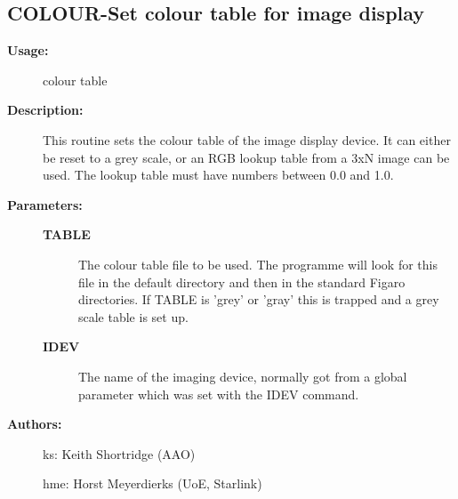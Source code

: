 \subsection{COLOUR-\label{COLOUR}Set colour table for image display}
\begin{description}

\item [{\bf Usage:}]
 colour table

\item [{\bf Description:}]
 This routine sets the colour table of the image display device. It
 can either be reset to a grey scale, or an RGB lookup table from a
 3xN image can be used. The lookup table must have numbers between
 0.0 and 1.0.

\item [{\bf Parameters:}]
\begin{description}
\item [{\bf TABLE}]
 The colour table file to be used. The programme will look for
 this file in the default directory and then in the standard
 Figaro directories. If TABLE is 'grey' or 'gray' this is
 trapped and a grey scale table is set up.
\item [{\bf IDEV}]
 The name of the imaging device, normally got from a global
 parameter which was set with the IDEV command.
\end{description}

\item [{\bf Authors:}]
 ks: Keith Shortridge (AAO)

 hme: Horst Meyerdierks (UoE, Starlink)

\end{description}
